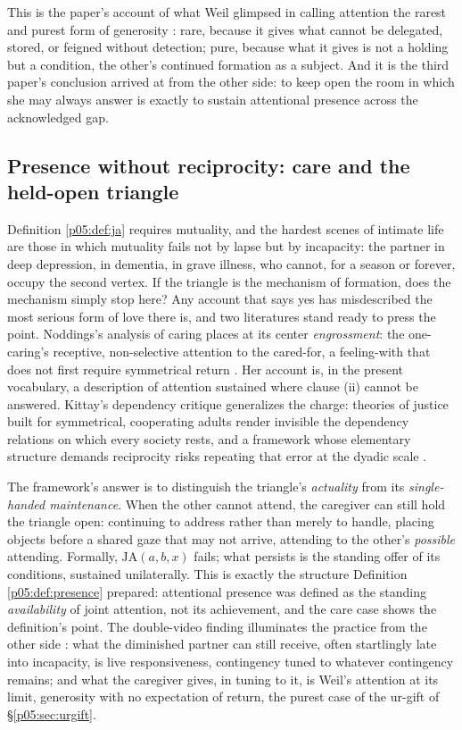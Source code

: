 \documentclass[11pt,a4paper]{article}
\theoremstyle{seriesthm}
\begin{document}
This is the paper's account of what Weil glimpsed in calling attention the rarest and purest form of generosity \parencite{weil1951}: rare, because it gives what cannot be delegated, stored, or feigned without detection; pure, because what it gives is not a holding but a condition, the other's continued formation as a subject. And it is the third paper's conclusion arrived at from the other side: to keep open the room in which she may always answer is exactly to sustain attentional presence across the acknowledged gap.

\subsection{Presence without reciprocity: care and the held-open triangle}
\label{p05:sec:care}

Definition \ref{p05:def:ja} requires mutuality, and the hardest scenes of intimate life are those in which mutuality fails not by lapse but by incapacity: the partner in deep depression, in dementia, in grave illness, who cannot, for a season or forever, occupy the second vertex. If the triangle is the mechanism of formation, does the mechanism simply stop here? Any account that says yes has misdescribed the most serious form of love there is, and two literatures stand ready to press the point. Noddings's analysis of caring places at its center \emph{engrossment}: the one-caring's receptive, non-selective attention to the cared-for, a feeling-with that does not first require symmetrical return \parencite{noddings1984}. Her account is, in the present vocabulary, a description of attention sustained where clause (ii) cannot be answered. Kittay's dependency critique generalizes the charge: theories of justice built for symmetrical, cooperating adults render invisible the dependency relations on which every society rests, and a framework whose elementary structure demands reciprocity risks repeating that error at the dyadic scale \parencite{kittay1999}.

The framework's answer is to distinguish the triangle's \emph{actuality} from its \emph{single-handed maintenance}. When the other cannot attend, the caregiver can still hold the triangle open: continuing to address rather than merely to handle, placing objects before a shared gaze that may not arrive, attending to the other's \emph{possible} attending. Formally, $\mathrm{JA}(a,b,x)$ fails; what persists is the standing offer of its conditions, sustained unilaterally. This is exactly the structure Definition \ref{p05:def:presence} prepared: attentional presence was defined as the standing \emph{availability} of joint attention, not its achievement, and the care case shows the definition's point. The double-video finding illuminates the practice from the other side \parencite{murray1985}: what the diminished partner can still receive, often startlingly late into incapacity, is live responsiveness, contingency tuned to whatever contingency remains; and what the caregiver gives, in tuning to it, is Weil's attention at its limit, generosity with no expectation of return, the purest case of the ur-gift of §\ref{p05:sec:urgift}.
\end{document}
